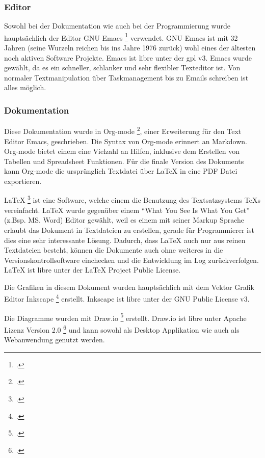 \subsubsection{Editor}
\label{sec:org99f5c71}

Sowohl bei der Dokumentation wie auch bei der Programmierung wurde
hauptsächlich der Editor GNU Emacs \footcite{emacs} verwendet. GNU Emacs ist mit
32 Jahren (seine Wurzeln reichen bis ins Jahre 1976 zurück) wohl eines der
ältesten noch aktiven Software Projekte. Emacs ist \gls{libre} unter der \gls{gpl}
v3. Emacs wurde gewählt, da es ein schneller, schlanker und sehr flexibler
Texteditor ist. Von normaler Textmanipulation über Taskmanagement bis zu Emails
schreiben ist alles möglich.

\subsubsection{Dokumentation}
\label{sec:org4b11da7}

Diese Dokumentation wurde in Org-mode \footcite{orgmode}, einer Erweiterung für
den Text Editor Emacs, geschrieben. Die Syntax von Org-mode erinnert an
Markdown. Org-mode bietet einem eine Vielzahl an Hilfen, inklusive dem
Erstellen von Tabellen und Spreadsheet Funktionen. Für die finale Version des
Dokuments kann Org-mode die ursprünglich Textdatei über \LaTeX{} in eine PDF Datei
exportieren.

\LaTeX{} \footcite{latex} ist eine Software, welche einem die Benutzung des
Textsatzsystems TeXs vereinfacht. \LaTeX{} wurde gegenüber einem "`What You See Is
What You Get"' (z.Bsp. MS. Word) Editor gewählt, weil es einem mit seiner Markup
Sprache erlaubt das Dokument in Textdateien zu erstellen, gerade für
Programmierer ist dies eine sehr interessante Lösung. Dadurch, dass \LaTeX{} auch
nur aus reinen Textdateien besteht, können die Dokumente auch ohne weiteres
in die Versionskontrollsoftware einchecken und die Entwicklung im Log
zurückverfolgen. \LaTeX{} ist \gls{libre} unter der \LaTeX{} Project Public
License.

Die Grafiken in diesem Dokument wurden hauptsächlich mit dem Vektor Grafik
Editor Inkscape \footcite{inkscape} erstellt. Inkscape ist \gls{libre} unter der
GNU Public License v3.

Die Diagramme wurden mit Draw.io \footcite{draw} erstellt. Draw.io ist \gls{libre}
unter Apache Lizenz Version 2.0 \footcite{apache} und kann sowohl als Desktop
Applikation wie auch als Webanwendung genutzt werden.

